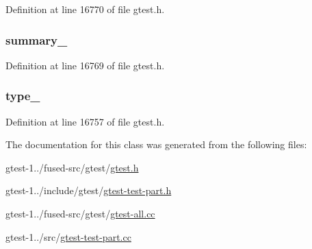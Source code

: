 \-Definition at line 16770 of file gtest.\-h.

\hypertarget{classtesting_1_1TestPartResult_a76f786d3c0a513571049db63b2ddf21b}{
\subsubsection[{summary\-\_\-}]{ {\bf summary\-\_\-}}}\label{d9/d98/classtesting_1_1TestPartResult_a76f786d3c0a513571049db63b2ddf21b}


\-Definition at line 16769 of file gtest.\-h.

\hypertarget{classtesting_1_1TestPartResult_ae96b07c06ceff094f476fd92cbe89e10}{
\subsubsection[{type\-\_\-}]{ {\bf type\-\_\-}}}\label{d9/d98/classtesting_1_1TestPartResult_ae96b07c06ceff094f476fd92cbe89e10}


\-Definition at line 16757 of file gtest.\-h.



\-The documentation for this class was generated from the following files\-:\begin{DoxyCompactItemize}
\item 
gtest-\/1../fused-\/src/gtest/\hyperlink{fused-src_2gtest_2gtest_8h}{gtest.\-h}\item 
gtest-\/1../include/gtest/\hyperlink{gtest-test-part_8h}{gtest-\/test-\/part.\-h}\item 
gtest-\/1../fused-\/src/gtest/\hyperlink{fused-src_2gtest_2gtest-all_8cc}{gtest-\/all.\-cc}\item 
gtest-\/1../src/\hyperlink{gtest-test-part_8cc}{gtest-\/test-\/part.\-cc}\end{DoxyCompactItemize}
